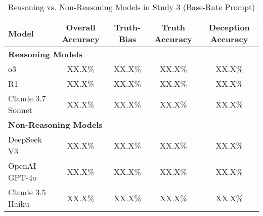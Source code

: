 \documentclass{article}
\begin{document}
\begin{table}[ht]
\centering
\caption{Reasoning vs. Non-Reasoning Models in Study 3 (Base-Rate Prompt)}
\begin{tabular}{lcccc}
\toprule
\textbf{Model} & \textbf{Overall Accuracy} & \textbf{Truth-Bias} & \textbf{Truth Accuracy} & \textbf{Deception Accuracy} \\
\midrule
\multicolumn{5}{l}{\textbf{Reasoning Models}} \\
o3 & XX.X\% & XX.X\% & XX.X\% & XX.X\% \\
R1 & XX.X\% & XX.X\% & XX.X\% & XX.X\% \\
Claude 3.7 Sonnet & XX.X\% & XX.X\% & XX.X\% & XX.X\% \\
\midrule
\multicolumn{5}{l}{\textbf{Non-Reasoning Models}} \\
DeepSeek V3 & XX.X\% & XX.X\% & XX.X\% & XX.X\% \\
OpenAI GPT-4o & XX.X\% & XX.X\% & XX.X\% & XX.X\% \\
Claude 3.5 Haiku & XX.X\% & XX.X\% & XX.X\% & XX.X\% \\
\bottomrule
\end{tabular}
\label{tab:study1_model_comparison}
\end{table}
\end{document}
